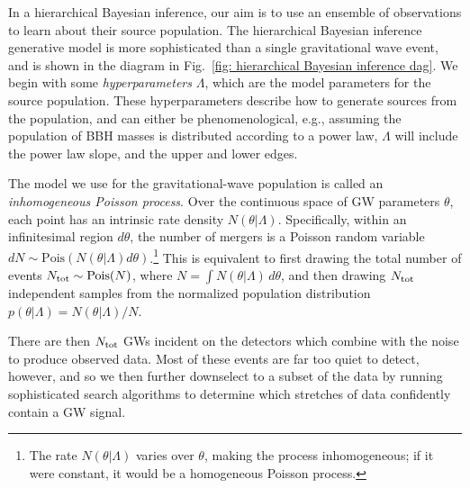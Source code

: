 \begin{refsection}
In a hierarchical Bayesian inference, our aim is to use an ensemble of observations to learn about their source population. The hierarchical Bayesian inference generative model is more sophisticated than a single gravitational wave event, and is shown in the diagram in Fig.~\ref{fig: hierarchical Bayesian inference dag}. We begin with some \textit{hyperparameters} $\Lambda$, which are the model parameters for the source population. These hyperparameters describe how to generate sources from the population, and can either be phenomenological, e.g., assuming the population of \ac{BBH} masses is distributed according to a power law, $\Lambda$ will include the power law slope, and the upper and lower edges.

The model we use for the gravitational-wave population is called an \textit{inhomogeneous Poisson process}. Over the continuous space of \ac{GW} parameters $\theta$, each point has an intrinsic rate density $N(\theta|\Lambda)$. Specifically, within an infinitesimal region $d\theta$, the number of mergers is a Poisson random variable $dN \sim \mathrm{Pois}(N(\theta|\Lambda)d\theta)$.\footnote{The rate $N(\theta|\Lambda)$ varies over $\theta$, making the process inhomogeneous; if it were constant, it would be a homogeneous Poisson process.} This is equivalent to first drawing the total number of events $N_{\rm tot} \sim \mathrm{Pois}(N)$, where $N = \int N(\theta|\Lambda) \, d\theta$, and then drawing $N_{\rm tot}$ independent samples from the normalized population distribution $p(\theta|\Lambda) = N(\theta|\Lambda)/N$. 

There are then $N_{\rm tot}$ \acp{GW} incident on the detectors which combine with the noise to produce observed data. Most of these events are far too quiet to detect, however, and so we then further downselect to a subset of the data by running sophisticated search algorithms \citep[e.g.,][]{Allen:2005fk, 2017CQGra..34f4003Z, 2019CQGra..36o5010C, 2021CQGra..38m5014D, 2021CQGra..38s5016S, 2022arXiv221015633A, 2022arXiv221015634A, 2021PTEP.2021eA102A, 2022CQGra..39q5004A} to determine which stretches of data confidently contain a \ac{GW} signal. 

\begin{figure}[htbp]
    \centering
\end{figure}
\end{refsection}
